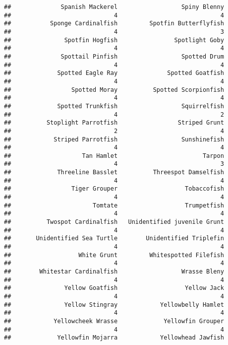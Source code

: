 \documentclass[
]{article}
\begin{document}
\begin{verbatim}
##              Spanish Mackerel                  Spiny Blenny 
##                             4                             4 
##           Sponge Cardinalfish         Spotfin Butterflyfish 
##                             4                             3 
##               Spotfin Hogfish                Spotlight Goby 
##                             4                             4 
##              Spottail Pinfish                  Spotted Drum 
##                             4                             4 
##             Spotted Eagle Ray              Spotted Goatfish 
##                             4                             4 
##                 Spotted Moray          Spotted Scorpionfish 
##                             4                             4 
##             Spotted Trunkfish                  Squirrelfish 
##                             4                             2 
##          Stoplight Parrotfish                 Striped Grunt 
##                             2                             4 
##            Striped Parrotfish                  Sunshinefish 
##                             4                             4 
##                    Tan Hamlet                        Tarpon 
##                             4                             3 
##             Threeline Basslet          Threespot Damselfish 
##                             4                             4 
##                 Tiger Grouper                   Tobaccofish 
##                             4                             4 
##                       Tomtate                   Trumpetfish 
##                             4                             4 
##          Twospot Cardinalfish   Unidentified juvenile Grunt 
##                             4                             4 
##       Unidentified Sea Turtle        Unidentified Triplefin 
##                             4                             4 
##                   White Grunt         Whitespotted Filefish 
##                             4                             4 
##        Whitestar Cardinalfish                  Wrasse Bleny 
##                             4                             4 
##               Yellow Goatfish                   Yellow Jack 
##                             4                             4 
##               Yellow Stingray            Yellowbelly Hamlet 
##                             4                             4 
##            Yellowcheek Wrasse             Yellowfin Grouper 
##                             4                             4 
##             Yellowfin Mojarra            Yellowhead Jawfish 

\end{verbatim}
\end{document}
